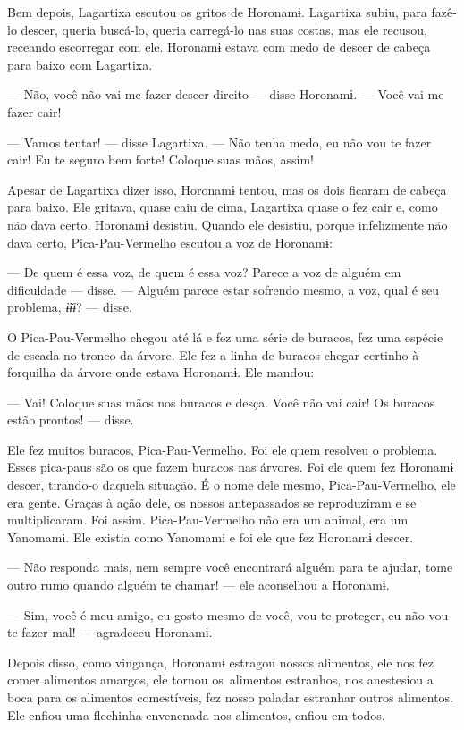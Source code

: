 Bem depois, Lagartixa escutou os gritos de Horonamɨ. Lagartixa subiu,
 para fazê-lo descer, queria buscá-lo, queria carregá-lo nas suas costas,
 mas ele recusou, receando escorregar com ele. Horonamɨ estava com medo
 de descer de cabeça para baixo com Lagartixa. 

--- Não, você não vai me fazer descer direito --- disse
Horonamɨ. --- Você vai me fazer cair! 

--- Vamos tentar! --- disse Lagartixa. --- Não tenha medo, eu não vou te
fazer cair! Eu te seguro bem forte! Coloque suas mãos, assim! 

Apesar de Lagartixa dizer isso, Horonamɨ tentou, mas os dois ficaram de
cabeça para baixo. Ele gritava, quase caiu de cima, Lagartixa quase o
fez cair e, como não dava certo, Horonamɨ desistiu. Quando ele desistiu,
porque infelizmente não dava certo, Pica-Pau-Vermelho escutou a voz de
Horonamɨ: 

--- De quem é essa voz, de quem é essa voz? Parece a voz de alguém em
dificuldade --- disse. --- Alguém parece estar sofrendo mesmo, a voz,
qual é seu problema, \textit{ɨ̃ɨɨ}? --- disse. 

O Pica-Pau-Vermelho chegou até lá e fez uma série de buracos, fez uma
espécie de escada no tronco da árvore. Ele fez a linha de buracos chegar
certinho à forquilha da árvore onde estava Horonamɨ. Ele mandou: 

--- Vai! Coloque suas mãos nos buracos e desça. Você não vai cair! Os
buracos estão prontos! --- disse. 

Ele fez muitos buracos, Pica-Pau-Vermelho. Foi ele quem resolveu o
 problema. Esses pica-paus são os que fazem buracos nas árvores. Foi ele
 quem fez Horonamɨ descer, tirando-o \mbox{daquela} situação. É o nome dele
 mesmo, Pica-Pau-Vermelho, ele era gente. Graças à ação dele, os nossos 
 antepassados se reproduziram e se multiplicaram. Foi assim. Pica-Pau-Vermelho 
 não era um animal, era um Yanomami. Ele existia como Yanomami e foi ele que fez Horonamɨ descer.

--- Não responda mais, nem sempre você encontrará alguém para te
ajudar, tome outro rumo quando alguém te chamar! --- ele aconselhou a
Horonamɨ. 

--- Sim, você é meu amigo, eu gosto mesmo de você, vou te proteger, eu
não vou te fazer mal! --- agradeceu Horonamɨ. 

Depois disso, como vingança, Horonamɨ estragou nossos alimentos, ele nos
 fez comer alimentos amargos, ele tornou os~alimentos estranhos, nos
 anestesiou a boca para os alimentos comestíveis, fez nosso paladar
 estranhar outros alimentos. Ele enfiou uma flechinha envenenada nos
 alimentos, enfiou em todos.

